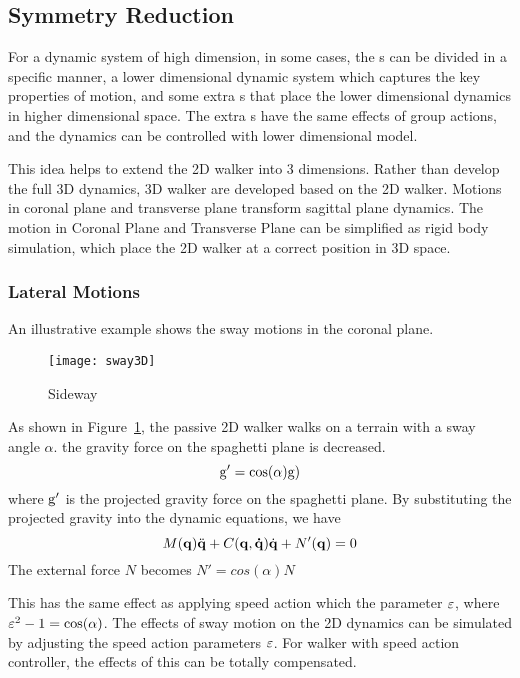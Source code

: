 {\subsection{Symmetry Reduction}
For a dynamic system of high dimension, in some cases, the {\dof}s can be divided in a specific manner,
a lower dimensional dynamic system which captures the key properties of motion, 
and some extra {\dof}s that place the lower dimensional dynamics in higher dimensional space.
The extra {\dof}s have the same effects of group actions, and the dynamics can be controlled with lower dimensional model.



This idea helps to extend the 2D walker into 3 dimensions.
Rather than develop the full 3D dynamics, 3D walker are developed based on the 2D walker.
Motions in coronal plane and transverse plane transform sagittal plane dynamics.
The motion in Coronal Plane and Transverse Plane can be simplified as rigid body simulation, which place the 2D walker at a correct position in 3D space.

\subsubsection*{Lateral Motions}
An illustrative example shows the sway motions in the coronal plane.

\begin{figure}[!htbp]
  \begin{center}
      \texttt{[image: sway3D]}
    \caption{Sideway}
    \label{fig:sidesway}
\end{center}
\end{figure}

As shown in Figure~\ref{fig:sidesway}, the passive 2D walker walks on a terrain with a sway angle $\alpha$.
the gravity force on the spaghetti plane is decreased.
\[
\mathrm{g}'=\cos(\alpha)\mathrm{g})
\]
where $\mathrm{g}'$ is the projected gravity force on the spaghetti plane.
By substituting the projected gravity into the dynamic equations, we have
\begin{equation}
\label{eq:flyequation}
M(\mathbf{q}) \ddot{\mathbf{q}} + C(\mathbf{q,\dot{q}})\dot{\mathbf{q}} + N'(\mathbf{q}) = 0
\end{equation}
The external force $N$ becomes $N'=cos(\alpha)N$

This has the same effect as applying speed action which the parameter $\varepsilon$, where $\varepsilon^2-1=\cos(\alpha)$.
The effects of sway motion on the 2D dynamics can be simulated by adjusting the speed action parameters $\varepsilon$.
For walker with speed action controller, the effects of this {\dof} can be totally compensated.

}
